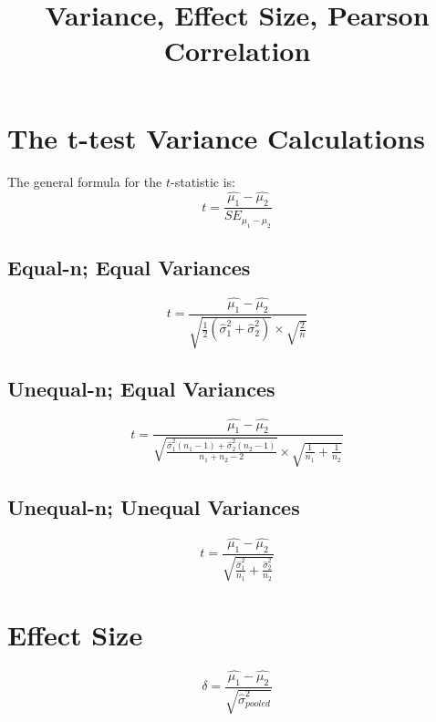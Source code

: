 \documentclass[12pt]{article}
\title{Variance, Effect Size, Pearson Correlation}
\author{\myname}
\date{}   %
\def \mysigma{\hat{\sigma}^2}
\begin{document}
\maketitle


\section{The t-test Variance Calculations}

The general formula for the $t$-statistic is:
\begin{equation}
  t = \frac{\hat{\mu_1} - \hat{\mu_2}}{SE_{\mu_1-\mu_2}}
\end{equation}

\subsection{Equal-n; Equal Variances}
\begin{equation}
  t = \frac{\hat{\mu_1} - \hat{\mu_2}}{\sqrt{\frac{1}{2}(\mysigma_1 + \mysigma_2)}\times\sqrt{\frac{2}{n}}}
\end{equation}

\subsection{Unequal-n; Equal Variances}
\begin{equation}
  t = \frac{\hat{\mu_1} - \hat{\mu_2}}{\sqrt{\frac{\mysigma_1(n_1-1) + \mysigma_2(n_2-1)}{n_1+n_2-2}}\times\sqrt{\frac{1}{n_1}+\frac{1}{n_2}}}
\end{equation}

\subsection{Unequal-n; Unequal Variances}
\begin{equation}
  t = \frac{\hat{\mu_1} - \hat{\mu_2}}{\sqrt{\frac{\mysigma_1}{n_1} + \frac{\mysigma_2}{n_2}}}
\end{equation}



\section{Effect Size}

\begin{equation}
  \delta = \frac{\hat{\mu_1} - \hat{\mu_2}}{\sqrt{\mysigma_{pooled}}}
\end{equation}
\end{document}
